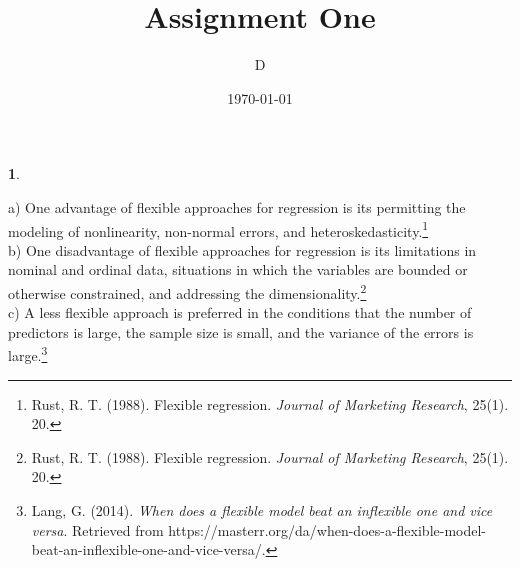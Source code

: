 \documentclass[10pt]{article}
\author{D}
\newtheorem{prob}{\bm{$Problem$}}
\begin{document}
\title{Assignment One}
\date{\today}
\maketitle
\thispagestyle{fancy}
\thispagestyle{fancy}

\begin{prob}
\end{prob}
\vspace{3mm}

a) One advantage of flexible approaches for regression is its permitting the modeling of nonlinearity, non-normal errors, and heteroskedasticity.\footnote{ Rust, R. T. (1988). Flexible regression. \textit{Journal of Marketing Research}, 25(1). 20.}\\

b) One disadvantage of flexible approaches for regression is its limitations in nominal and ordinal data, situations in which the variables are bounded or otherwise constrained, and addressing the dimensionality.\footnote{ Rust, R. T. (1988). Flexible regression. \textit{Journal of Marketing Research}, 25(1). 20.}\\

c) A less flexible approach is preferred in the conditions that the number of predictors is large, the sample size is small, and the variance of the errors is large.\footnote{ Lang, G. (2014). \textit{When does a flexible model beat an inflexible one and vice versa}. Retrieved from https://masterr.org/da/when-does-a-flexible-model-beat-an-inflexible-one-and-vice-versa/.}
\vspace{3mm}
\end{document}

